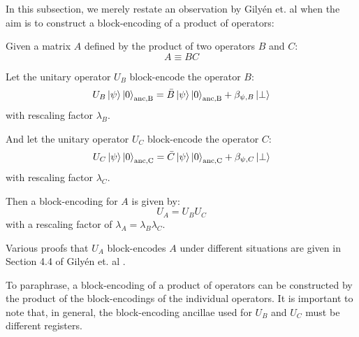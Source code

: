 In this subsection, we merely restate an observation by Gilyén et. al \cite{gilyen2019quantum} when the aim is to construct a block-encoding of a product of operators:
\begin{theorem}
    \label{th:product}
    Given a matrix $A$ defined by the product of two operators $B$ and $C$:
    \begin{equation}
        \label{eq:product}
        A \equiv BC
    \end{equation}
    
    Let the unitary operator $U_B$ block-encode the operator $B$:
    \begin{equation}
        U_B \ket{\psi}\ket{0}_\text{anc,B} = \bar{B} \ket{\psi} \ket{0}_\text{anc,B} + \beta_{\psi, B} \ket{\perp}
    \end{equation}
    with rescaling factor $\lambda_B$.
    
    And let the unitary operator $U_C$ block-encode the operator $C$:
    \begin{equation}
        U_C \ket{\psi}\ket{0}_\text{anc,C} = \bar{C} \ket{\psi} \ket{0}_\text{anc,C} + \beta_{\psi, C} \ket{\perp}
    \end{equation}
    with rescaling factor $\lambda_C$.

    Then a block-encoding for $A$ is given by:
    \begin{equation}
        \label{eq:product-be}
        U_A = U_B U_C
    \end{equation}
    with a rescaling factor of $\lambda_A = \lambda_B \lambda_C$.
\end{theorem}
Various proofs that $U_A$ block-encodes $A$ under different situations are given in Section 4.4 of Gilyén et. al \cite{gilyen2019quantum}.

To paraphrase, a block-encoding of a product of operators can be constructed by the product of the block-encodings of the individual operators. 
It is important to note that, in general, the block-encoding ancillae used for $U_B$ and $U_C$ must be different registers.
